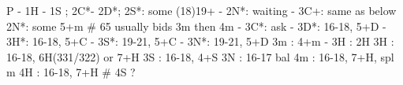 P - 1H - 1S ; 2C*- 2D*; 
2S*: some (18)19+
   - 2N*: waiting
        - 3C+: same as below
2N*: some 5+m  # 65 usually bids 3m then 4m
   - 3C*: ask
        - 3D*: 16-18, 5+D
        - 3H*: 16-18, 5+C
        - 3S*: 19-21, 5+C
        - 3N*: 19-21, 5+D
3m : 4+m
   - 3H : 2H
3H : 16-18, 6H(331/322) or 7+H
3S : 16-18, 4+S
3N : 16-17 bal
4m : 16-18, 7+H, spl m
4H : 16-18, 7+H
# 4S ?